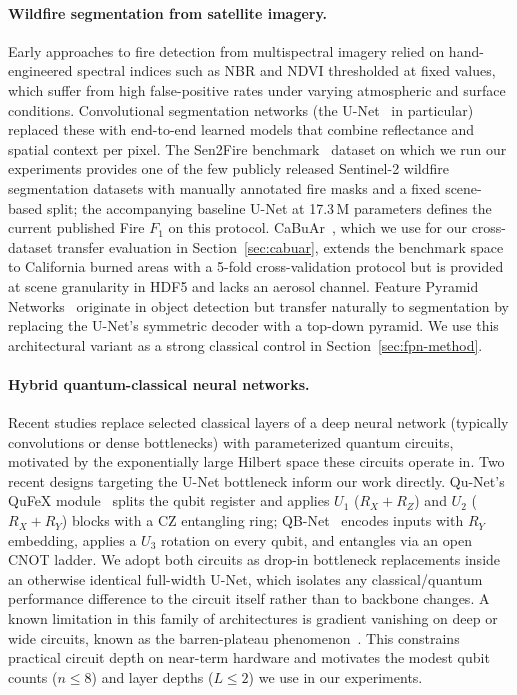 \documentclass{article}
\begin{document}
\paragraph{Wildfire segmentation from satellite imagery.} Early approaches to fire detection from multispectral imagery relied on hand-engineered spectral indices such as NBR and NDVI thresholded at fixed values, which suffer from high false-positive rates under varying atmospheric and surface conditions. Convolutional segmentation networks (the U-Net~\cite{unet} in particular) replaced these with end-to-end learned models that combine reflectance and spatial context per pixel. The Sen2Fire benchmark~\cite{sen2fire} dataset on which we run our experiments provides one of the few publicly released Sentinel-2 wildfire segmentation datasets with manually annotated fire masks and a fixed scene-based split; the accompanying baseline U-Net at 17.3\,M parameters defines the current published Fire $F_1$ on this protocol. CaBuAr~\cite{cabuar}, which we use for our cross-dataset transfer evaluation in Section~\ref{sec:cabuar}, extends the benchmark space to California burned areas with a 5-fold cross-validation protocol but is provided at scene granularity in HDF5 and lacks an aerosol channel. Feature Pyramid Networks~\cite{fpn} originate in object detection but transfer naturally to segmentation by replacing the U-Net's symmetric decoder with a top-down pyramid. We use this architectural variant as a strong classical control in Section~\ref{sec:fpn-method}.

\paragraph{Hybrid quantum-classical neural networks.} Recent studies replace selected classical layers of a deep neural network (typically convolutions or dense bottlenecks) with parameterized quantum circuits, motivated by the exponentially large Hilbert space these circuits operate in. Two recent designs targeting the U-Net bottleneck inform our work directly. Qu-Net's QuFeX module~\cite{qufex} splits the qubit register and applies $U_1$ ($R_X{+}R_Z$) and $U_2$ ($R_X{+}R_Y$) blocks with a CZ entangling ring; QB-Net~\cite{qbnet} encodes inputs with $R_Y$ embedding, applies a $U_3$ rotation on every qubit, and entangles via an open CNOT ladder. We adopt both circuits as drop-in bottleneck replacements inside an otherwise identical full-width U-Net, which isolates any classical/quantum performance difference to the circuit itself rather than to backbone changes. A known limitation in this family of architectures is gradient vanishing on deep or wide circuits, known as the barren-plateau phenomenon~\cite{barren-plateaus}. This constrains practical circuit depth on near-term hardware and motivates the modest qubit counts ($n \le 8$) and layer depths ($L \le 2$) we use in our experiments.
\end{document}
